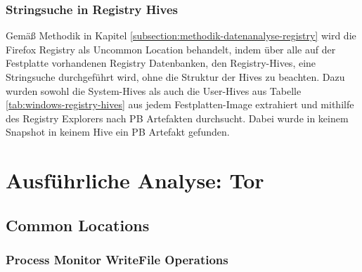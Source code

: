 \begin{appendices}
\subsubsection*{Stringsuche in Registry Hives}
Gemäß Methodik in Kapitel \ref{subsection:methodik-datenanalyse-registry} wird die Firefox Registry als Uncommon Location behandelt, indem über alle auf der Festplatte vorhandenen Registry Datenbanken, den Registry-Hives, eine Stringsuche durchgeführt wird, ohne die Struktur der Hives zu beachten. 
Dazu wurden sowohl die System-Hives als auch die User-Hives aus Tabelle \ref{tab:windows-registry-hives} aus jedem Festplatten-Image extrahiert und mithilfe des Registry Explorers nach PB Artefakten durchsucht.
Dabei wurde in keinem Snapshot in keinem Hive ein PB Artefakt gefunden.




\section{Ausführliche Analyse: Tor}
\subsection{Common Locations}

\subsubsection*{Process Monitor WriteFile Operations}


\end{appendices}

